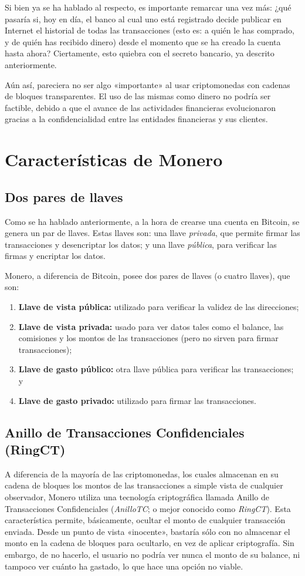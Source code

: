 \documentclass[12pt,a4paper,twoside]{book}
\begin{document}
Si bien ya se ha hablado al respecto, es importante remarcar una vez más: ¿qué pasaría si, hoy en día, el banco al cual uno está registrado decide publicar en Internet el historial de todas las transacciones (esto es: a quién le has comprado, y de quién has recibido dinero) desde el momento que se ha creado la cuenta hasta ahora? Ciertamente, esto quiebra con el secreto bancario, ya descrito anteriormente.

Aún así, pareciera no ser algo «importante» al usar criptomonedas con cadenas de bloques transparentes. El uso de las mismas como dinero no podría ser factible, debido a que el avance de las actividades financieras evolucionaron gracias a la confidencialidad entre las entidades financieras y sus clientes.

\section{Características de Monero}
\subsection{Dos pares de llaves}
Como se ha hablado anteriormente, a la hora de crearse una cuenta en Bitcoin, se genera un par de llaves. Estas llaves son: una llave \textit{privada}, que permite firmar las transacciones y desencriptar los datos; y una llave \textit{pública}, para verificar las firmas y encriptar los datos.

Monero, a diferencia de Bitcoin, posee dos pares de llaves (o cuatro llaves), que son:

\begin{enumerate}
\item \textbf{Llave de vista pública:} utilizado para verificar la validez de las direcciones;
\item \textbf{Llave de vista privada:} usado para ver datos tales como el balance, las comisiones y los montos de las transacciones (pero no sirven para firmar transacciones);
\item \textbf{Llave de gasto público:} otra llave pública para verificar las transacciones; y
\item \textbf{Llave de gasto privado:} utilizado para firmar las transacciones.
\end{enumerate}

\subsection{Anillo de Transacciones Confidenciales (RingCT)}
A diferencia de la mayoría de las criptomonedas, los cuales almacenan en su cadena de bloques los montos de las transacciones a simple vista de cualquier observador, Monero utiliza una tecnología criptográfica llamada Anillo de Transacciones Confidenciales (\textit{AnilloTC}; o mejor conocido como \textit{RingCT}). Esta característica permite, básicamente, ocultar el monto de cualquier transacción enviada. Desde un punto de vista «inocente», bastaría sólo con no almacenar el monto en la cadena de bloques para ocultarlo, en vez de aplicar criptografía. Sin embargo, de no hacerlo, el usuario no podría ver nunca el monto de su balance, ni tampoco ver cuánto ha gastado, lo que hace una opción no viable.
\end{document}
